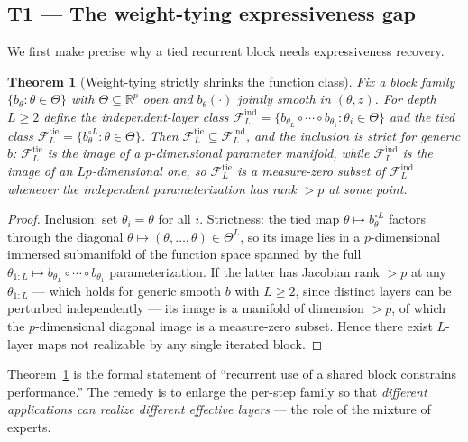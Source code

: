\documentclass[11pt]{article}
\newtheorem{theorem}{Theorem}[section]
\newcommand{\R}{\mathbb{R}}
\begin{document}
\subsection{T1 --- The weight-tying expressiveness gap}
\label{sec:t1}

We first make precise why a tied recurrent block needs expressiveness recovery.

\begin{theorem}[Weight-tying strictly shrinks the function class]
\label{thm:tied-gap}
Fix a block family $\{b_\theta : \theta\in\Theta\}$ with $\Theta\subseteq\R^p$ open and
$b_\theta(\cdot)$ jointly smooth in $(\theta, z)$.  For depth $L\ge 2$ define the
independent-layer class $\mathcal F^{\mathrm{ind}}_L = \{b_{\theta_L}\circ\cdots\circ b_{\theta_1} : \theta_i\in\Theta\}$
and the tied class $\mathcal F^{\mathrm{tie}}_L = \{b_\theta^{\circ L} : \theta\in\Theta\}$.
Then $\mathcal F^{\mathrm{tie}}_L \subseteq \mathcal F^{\mathrm{ind}}_L$, and the inclusion
is strict for generic $b$: $\mathcal F^{\mathrm{tie}}_L$ is the image of a $p$-dimensional
parameter manifold, while $\mathcal F^{\mathrm{ind}}_L$ is the image of an
$Lp$-dimensional one, so $\mathcal F^{\mathrm{tie}}_L$ is a measure-zero subset of
$\mathcal F^{\mathrm{ind}}_L$ whenever the independent parameterization has rank $>p$ at
some point.
\end{theorem}

\begin{proof}
Inclusion: set $\theta_i=\theta$ for all $i$.  Strictness: the tied map
$\theta\mapsto b_\theta^{\circ L}$ factors through the diagonal
$\theta\mapsto(\theta,\dots,\theta)\in\Theta^L$, so its image lies in a $p$-dimensional
immersed submanifold of the function space spanned by the full
$\theta_{1:L}\mapsto b_{\theta_L}\circ\cdots\circ b_{\theta_1}$ parameterization.  If the
latter has Jacobian rank $>p$ at any $\theta_{1:L}$ --- which holds for generic smooth
$b$ with $L\ge 2$, since distinct layers can be perturbed independently --- its image is
a manifold of dimension $>p$, of which the $p$-dimensional diagonal image is a
measure-zero subset.  Hence there exist $L$-layer maps not realizable by any single
iterated block.
\end{proof}

Theorem~\ref{thm:tied-gap} is the formal statement of ``recurrent use of a shared block
constrains performance.''  The remedy is to enlarge the per-step family so that
\emph{different applications can realize different effective layers} --- the role of the
mixture of experts.
\end{document}
